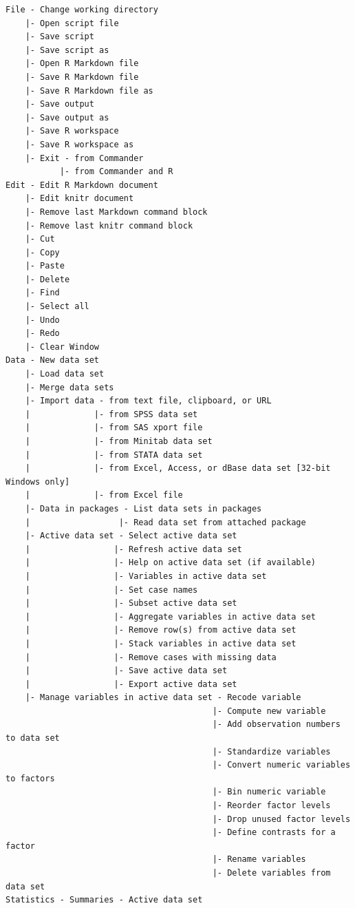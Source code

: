 \documentclass{article}%
\begin{document}
\begin{verbatim}
File - Change working directory
    |- Open script file
    |- Save script
    |- Save script as
    |- Open R Markdown file
    |- Save R Markdown file
    |- Save R Markdown file as
    |- Save output
    |- Save output as
    |- Save R workspace
    |- Save R workspace as
    |- Exit - from Commander
           |- from Commander and R
Edit - Edit R Markdown document
    |- Edit knitr document
    |- Remove last Markdown command block
    |- Remove last knitr command block
    |- Cut
    |- Copy
    |- Paste
    |- Delete
    |- Find
    |- Select all
    |- Undo
    |- Redo
    |- Clear Window
Data - New data set
    |- Load data set
    |- Merge data sets
    |- Import data - from text file, clipboard, or URL
    |             |- from SPSS data set
    |             |- from SAS xport file
    |             |- from Minitab data set
    |             |- from STATA data set
    |             |- from Excel, Access, or dBase data set [32-bit Windows only]
    |             |- from Excel file
    |- Data in packages - List data sets in packages
    |                  |- Read data set from attached package
    |- Active data set - Select active data set
    |                 |- Refresh active data set
    |                 |- Help on active data set (if available)
    |                 |- Variables in active data set
    |                 |- Set case names
    |                 |- Subset active data set
    |                 |- Aggregate variables in active data set
    |                 |- Remove row(s) from active data set
    |                 |- Stack variables in active data set
    |                 |- Remove cases with missing data
    |                 |- Save active data set
    |                 |- Export active data set
    |- Manage variables in active data set - Recode variable
                                          |- Compute new variable
                                          |- Add observation numbers to data set
                                          |- Standardize variables
                                          |- Convert numeric variables to factors
                                          |- Bin numeric variable
                                          |- Reorder factor levels
                                          |- Drop unused factor levels
                                          |- Define contrasts for a factor
                                          |- Rename variables
                                          |- Delete variables from data set
Statistics - Summaries - Active data set

\end{verbatim}
\end{document}

